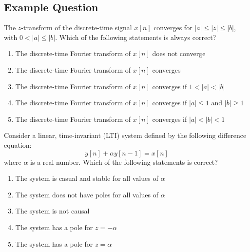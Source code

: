 \subsection{Example Question}
\begin{q}{}
The $z$-transform of the discrete-time signal $x[n]$ converges for $\lvert a \rvert \leq \lvert z \rvert \leq \lvert b \rvert$, with $0 < \lvert a \rvert \leq \lvert b \rvert$. Which of the following statements is always correct?

\begin{enumerate}[label=(\alph*)]
    \item The discrete-time Fourier transform of $x[n]$ does not converge
    \item The discrete-time Fourier transform of $x[n]$ converges
    \item The discrete-time Fourier transform of $x[n]$ converges if $1 < \lvert a \rvert < \lvert b \rvert$
    \item The discrete-time Fourier transform of $x[n]$ converges if $\lvert a \rvert \leq 1$ and $\lvert b \rvert \geq 1$
    \item The discrete-time Fourier transform of $x[n]$ converges if $\lvert a \rvert < \lvert b \rvert < 1$
\end{enumerate}
\end{q}
\begin{q}{}
Consider a linear, time-invariant (LTI) system defined by the following difference equation:
\[
    y[n] + \alpha y[n-1] = x[n]
\]
where $\alpha$ is a real number. Which of the following statements is correct?

\begin{enumerate}[label=(\alph*)]
    \item The system is casual and stable for all values of $\alpha$
    \item The system does not have poles for all values of $\alpha$
    \item The system is not causal
    \item The system has a pole for $z=-\alpha$
    \item The system has a pole for $z=\alpha$
\end{enumerate}
\end{q}
